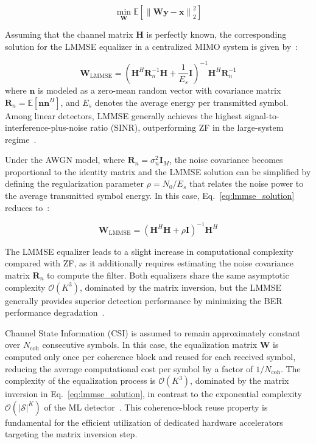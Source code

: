 \documentclass[12pt]{article}
\begin{document}
\begin{equation}
\min_{\mathbf{W}}
\mathbb{E}
\left[
\left\|\mathbf{W}\mathbf{y}-\mathbf{x}\right\|_2^2
\right]
\label{eq:lmmse_opt}
\end{equation}

Assuming that the channel matrix $\mathbf{H}$ is perfectly known, the
corresponding solution for the LMMSE equalizer in a centralized MIMO system
is given by~\cite{zhao2025jsac}:

\begin{equation}
\mathbf{W}_\text{LMMSE}=
\left(
\mathbf{H}^H\mathbf{R}_n^{-1}\mathbf{H}
+
\frac{1}{E_s}\mathbf{I}
\right)^{-1}
\mathbf{H}^H\mathbf{R}_n^{-1}
\label{eq:lmmse_solution}
\end{equation}
where $\mathbf{n}$ is modeled as a zero-mean random vector with covariance
matrix $\mathbf{R}_n = \mathbb{E}[\mathbf{n}\mathbf{n}^H]$, and $E_s$
denotes the average energy per transmitted symbol. Among linear detectors,
LMMSE generally achieves the highest signal-to-interference-plus-noise ratio
(SINR), outperforming ZF in the large-system regime~\cite{jeon2019}.


Under the AWGN model, where $\mathbf{R}_n = \sigma_n^2\mathbf{I}_M$, the
noise covariance becomes proportional to the identity matrix and the LMMSE
solution can be simplified by defining the regularization parameter
$\rho = N_0/E_s$ that relates the noise power to
the average transmitted symbol energy. In this case, Eq.~\eqref{eq:lmmse_solution} reduces
to~\cite{jeon2019}:

\begin{equation}
\mathbf{W}_\text{LMMSE}=
\left(
\mathbf{H}^H\mathbf{H}
+
\rho\mathbf{I}
\right)^{-1}
\mathbf{H}^H
\label{eq:lmmse_awgn}
\end{equation}

The LMMSE equalizer leads to a slight increase in computational complexity
compared with ZF, as it additionally requires estimating the noise covariance matrix $\mathbf{R}_n$ to compute the filter. Both equalizers share the same asymptotic complexity
$\mathcal{O}(K^3)$, dominated by the matrix inversion, but the LMMSE
generally provides superior detection performance by minimizing the BER
performance degradation~\cite{li-tradeofs}.

Channel State Information (CSI) is assumed to remain approximately constant
over $N_\text{coh}$ consecutive symbols. In this case, the equalization
matrix $\mathbf{W}$ is computed only once per coherence block and reused for
each received symbol, reducing the average computational cost per symbol by a
factor of $1/N_\text{coh}$. The complexity of the equalization process is
$\mathcal{O}(K^3)$, dominated by the matrix inversion in
Eq.~\eqref{eq:lmmse_solution}, in contrast to the exponential complexity
$\mathcal{O}(|\mathcal{S}|^K)$ of the ML detector~\cite{bello2022algorithms}.
This coherence-block reuse property is fundamental for the efficient
utilization of dedicated hardware accelerators targeting the matrix inversion
step.
\end{document}
